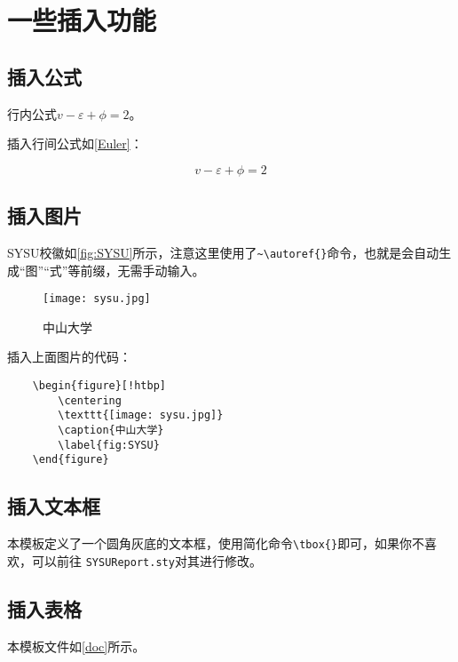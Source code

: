 \documentclass{SYSUReport}
\begin{document}
\section{一些插入功能}
\subsection{插入公式}

行内公式$v-\varepsilon+\phi=2$。

插入行间公式如\autoref{Euler}：

\begin{equation}
    v-\varepsilon+\phi=2
    \label{Euler}
\end{equation}

\subsection{插入图片}

SYSU校徽如\autoref{fig:SYSU}所示，注意这里使用了\verb|~\autoref{}|命令，也就是会自动生成“图”“式”等前缀，无需手动输入。

\begin{figure}[!htbp]
    \centering
    \texttt{[image: sysu.jpg]}
    \caption{中山大学}
    \label{fig:SYSU}
\end{figure}

插入上面图片的代码：

\begin{verbatim}
    \begin{figure}[!htbp]
        \centering
        \texttt{[image: sysu.jpg]}
        \caption{中山大学}
        \label{fig:SYSU}
    \end{figure}
\end{verbatim}

\subsection{插入文本框}
本模板定义了一个圆角灰底的文本框，使用简化命令\verb|\tbox{}|即可，如果你不喜欢，可以前往 \texttt{SYSUReport.sty}对其进行修改。


\subsection{插入表格}

本模板文件如\autoref{doc}所示。
\end{document}
